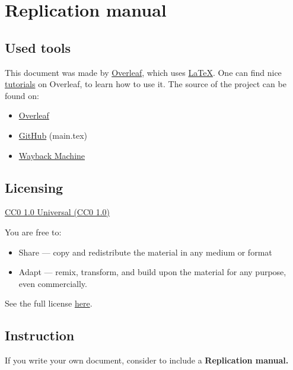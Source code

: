 \documentclass{article}
\begin{document}
\section{Replication manual}

\subsection{Used tools}

This document was made by \href{https://www.overleaf.com/}{Overleaf}, which uses \href{https://en.wikipedia.org/wiki/LaTeX}{LaTeX}.
One can find nice \href{https://www.overleaf.com/learn/latex/Tutorials}{tutorials} on Overleaf, to learn how to use it. The source of the project can be found on:
\begin{itemize}
    \item \href{https://www.overleaf.com/read/vjhvckyttxxx}{Overleaf}
    \item \href{https://github.com/konczer/OpenCurriculum}{GitHub} (main.tex)
    \item \href{https://web.archive.org/web/20211209191853/https://github.com/konczer/OpenCurriculum/blob/main/main.tex}{Wayback Machine}
\end{itemize}

\subsection{Licensing}

\href{https://creativecommons.org/publicdomain/zero/1.0/}{CC0 1.0 Universal (CC0 1.0)}

You are free to:
\begin{itemize}
    \item Share — copy and redistribute the material in any medium or format
    \item Adapt — remix, transform, and build upon the material
    for any purpose, even commercially.
\end{itemize}

See the full license \href{https://creativecommons.org/publicdomain/zero/1.0/legalcode}{here}.

\subsection{Instruction}

If you write your own document, consider to include a \bf{Replication manual}.

\newpage

\tableofcontents \label{sec:toc}
\end{document}
